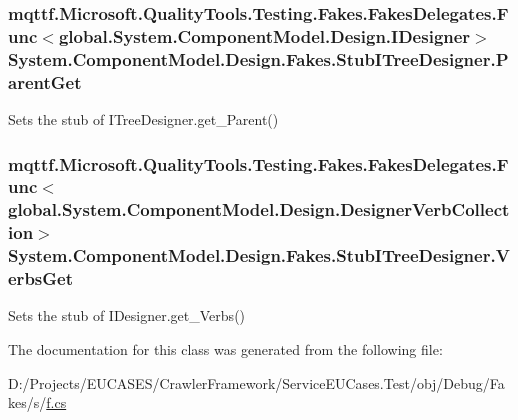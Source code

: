 \hypertarget{class_system_1_1_component_model_1_1_design_1_1_fakes_1_1_stub_i_tree_designer_aa5865e2a0f563a46ed09405cbd4f1d69}{
\subsubsection[{Parent\-Get}]{\setlength{\rightskip}{0pt plus 5cm}mqttf.\-Microsoft.\-Quality\-Tools.\-Testing.\-Fakes.\-Fakes\-Delegates.\-Func$<$global.\-System.\-Component\-Model.\-Design.\-I\-Designer$>$ System.\-Component\-Model.\-Design.\-Fakes.\-Stub\-I\-Tree\-Designer.\-Parent\-Get}}\label{class_system_1_1_component_model_1_1_design_1_1_fakes_1_1_stub_i_tree_designer_aa5865e2a0f563a46ed09405cbd4f1d69}


Sets the stub of I\-Tree\-Designer.\-get\-\_\-\-Parent()

\hypertarget{class_system_1_1_component_model_1_1_design_1_1_fakes_1_1_stub_i_tree_designer_a7e075324f3cf814bb6e627e7b843a2ec}{
\subsubsection[{Verbs\-Get}]{\setlength{\rightskip}{0pt plus 5cm}mqttf.\-Microsoft.\-Quality\-Tools.\-Testing.\-Fakes.\-Fakes\-Delegates.\-Func$<$global.\-System.\-Component\-Model.\-Design.\-Designer\-Verb\-Collection$>$ System.\-Component\-Model.\-Design.\-Fakes.\-Stub\-I\-Tree\-Designer.\-Verbs\-Get}}\label{class_system_1_1_component_model_1_1_design_1_1_fakes_1_1_stub_i_tree_designer_a7e075324f3cf814bb6e627e7b843a2ec}


Sets the stub of I\-Designer.\-get\-\_\-\-Verbs()



The documentation for this class was generated from the following file\-:\begin{DoxyCompactItemize}
\item 
D\-:/\-Projects/\-E\-U\-C\-A\-S\-E\-S/\-Crawler\-Framework/\-Service\-E\-U\-Cases.\-Test/obj/\-Debug/\-Fakes/s/\hyperlink{s_2f_8cs}{f.\-cs}\end{DoxyCompactItemize}
